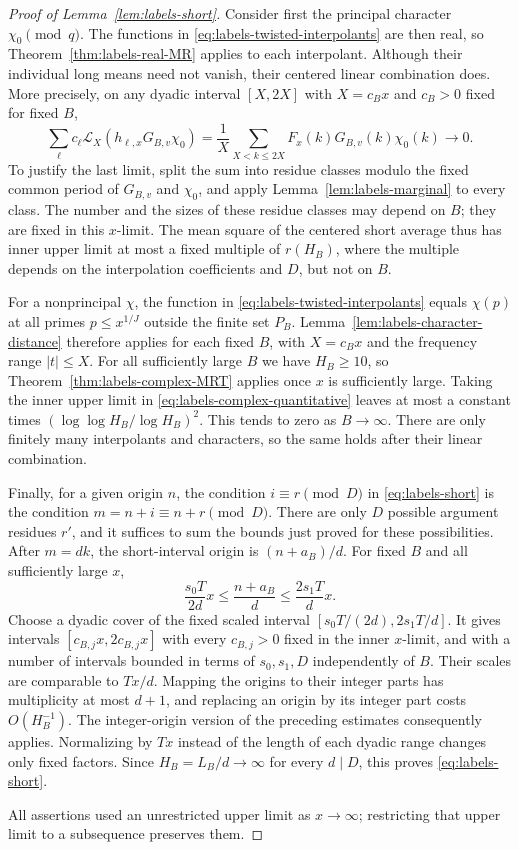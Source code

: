 \begin{proof}[Proof of Lemma~\ref{lem:labels-short}]
Consider first the principal character $\chi_0\pmod q$.
The functions in \eqref{eq:labels-twisted-interpolants} are then real,
so Theorem~\ref{thm:labels-real-MR} applies to each interpolant.
Although their individual long means need not vanish, their centered
linear combination does.  More precisely, on any dyadic interval
$[X,2X]$ with $X=c_Bx$ and $c_B>0$ fixed for fixed $B$,
\[
 \sum_\ell c_\ell\mathcal L_X
       (h_{\ell,x}G_{B,v}\chi_0)
 =\frac1X\sum_{X<k\leq2X}F_x(k)G_{B,v}(k)\chi_0(k)
 \longrightarrow0.
\]
To justify the last limit, split the sum into residue classes modulo
the fixed common period of $G_{B,v}$ and $\chi_0$, and apply
Lemma~\ref{lem:labels-marginal} to every class.  The number and the
sizes of these residue classes may depend on $B$; they are fixed in
this $x$-limit.  The mean square of the centered short average thus
has inner upper limit at most a fixed multiple of $r(H_B)$, where
the multiple depends on the interpolation coefficients and $D$, but not on
$B$.

For a nonprincipal $\chi$, the function in
\eqref{eq:labels-twisted-interpolants} equals $\chi(p)$ at all
primes $p\leq x^{1/J}$ outside the finite set $P_B$.
Lemma~\ref{lem:labels-character-distance} therefore applies for
each fixed $B$, with $X=c_Bx$ and the frequency range $|t|\leq X$.
For all sufficiently large $B$ we have $H_B\geq10$, so
Theorem~\ref{thm:labels-complex-MRT} applies once $x$ is sufficiently
large.  Taking the inner upper limit in
\eqref{eq:labels-complex-quantitative} leaves at most a constant times
$(\log\log H_B/\log H_B)^2$.  This tends to zero as $B\to\infty$.
There are only finitely many interpolants and characters, so the same
holds after their linear combination.

Finally, for a given origin $n$, the condition $i\equiv r\pmod D$
in \eqref{eq:labels-short} is the condition
$m=n+i\equiv n+r\pmod D$.  There are only $D$ possible argument
residues $r'$, and it suffices to sum the bounds just proved for
these possibilities.  After $m=dk$, the short-interval origin is
$(n+a_B)/d$.  For fixed $B$ and all sufficiently large $x$,
\[
 \frac{s_0T}{2d}x\le\frac{n+a_B}{d}\le\frac{2s_1T}{d}x.
\]
Choose a dyadic cover of the fixed scaled interval
$[s_0T/(2d),2s_1T/d]$.  It gives intervals
$[c_{B,j}x,2c_{B,j}x]$ with every $c_{B,j}>0$ fixed in the inner
$x$-limit, and with a number of intervals bounded in terms of
$s_0,s_1,D$ independently of $B$.  Their scales are comparable to
$Tx/d$.  Mapping the origins to their integer parts has multiplicity
at most $d+1$, and replacing an origin by its integer part costs
$O(H_B^{-1})$.  The integer-origin version
of the preceding estimates consequently applies.  Normalizing by
$Tx$ instead of the length of each dyadic range changes only fixed
factors.  Since $H_B=L_B/d\to\infty$ for every $d\mid D$, this
proves \eqref{eq:labels-short}.

All assertions used an unrestricted upper limit as $x\to\infty$;
restricting that upper limit to a subsequence preserves them.
\end{proof}


